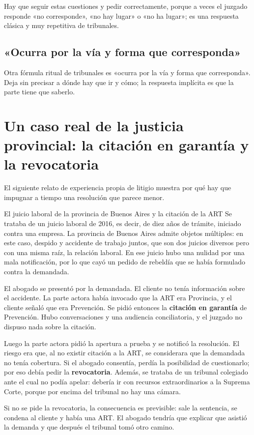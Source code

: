 \documentclass[12pt,oneside]{book}
\begin{document}
Hay que seguir estas cuestiones y pedir correctamente, porque a veces el juzgado responde «no corresponde», «no hay lugar» o «no ha lugar»; es una respuesta clásica y muy repetitiva de tribunales.

\subsection{«Ocurra por la vía y forma que corresponda»}

Otra fórmula ritual de tribunales es «ocurra por la vía y forma que corresponda». Deja sin precisar a dónde hay que ir y cómo; la respuesta implícita es que la parte tiene que saberlo.

\section{Un caso real de la justicia provincial: la citación en garantía y la revocatoria}

El siguiente relato de experiencia propia de litigio muestra por qué hay que impugnar a tiempo una resolución que parece menor.

\begin{example}{El juicio laboral de la provincia de Buenos Aires y la citación de la ART}
Se trataba de un juicio laboral de 2016, es decir, de diez años de trámite, iniciado contra una empresa. La provincia de Buenos Aires admite objetos múltiples: en este caso, despido y accidente de trabajo juntos, que son dos juicios diversos pero con una misma raíz, la relación laboral. En ese juicio hubo una nulidad por una mala notificación, por lo que cayó un pedido de rebeldía que se había formulado contra la demandada.

El abogado se presentó por la demandada. El cliente no tenía información sobre el accidente. La parte actora había invocado que la ART era Provincia, y el cliente señaló que era Prevención. Se pidió entonces la \textbf{citación en garantía} de Prevención. Hubo conversaciones y una audiencia conciliatoria, y el juzgado no dispuso nada sobre la citación.

Luego la parte actora pidió la apertura a prueba y se notificó la resolución. El riesgo era que, al no existir citación a la ART, se considerara que la demandada no tenía cobertura. Si el abogado consentía, perdía la posibilidad de cuestionarlo; por eso debía pedir la \textbf{revocatoria}. Además, se trataba de un tribunal colegiado ante el cual no podía apelar: debería ir con recursos extraordinarios a la Suprema Corte, porque por encima del tribunal no hay una cámara.

Si no se pide la revocatoria, la consecuencia es previsible: sale la sentencia, se condena al cliente y había una ART. El abogado tendría que explicar que asistió la demanda y que después el tribunal tomó otro camino.
\end{example}
\end{document}
